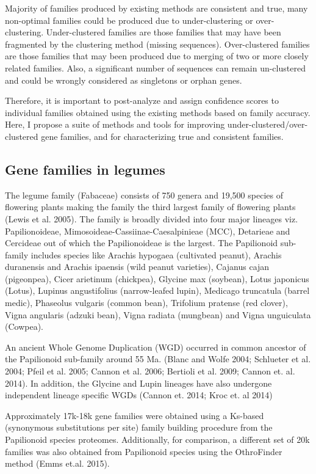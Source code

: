 \documentclass{article}
\begin{document}
		 Majority of families produced by existing methods are consistent and true, many non-optimal families could be produced due to under-clustering or over-clustering. Under-clustered families are those families that may have been fragmented by the clustering method (missing sequences). Over-clustered families are those families that may been produced due to merging of two or more closely related families. Also, a significant number of sequences can remain un-clustered and could be wrongly considered as singletons or orphan genes. 
		
		Therefore, it is important to post-analyze and assign confidence scores to individual families obtained using the existing methods based on family accuracy. Here, I propose a suite of methods and tools for improving under-clustered/over-clustered gene families, and for characterizing true and consistent families.
		
		\subsection{Gene families in legumes}
		The legume family (Fabaceae) consists of 750 genera and 19,500 species of flowering plants making the family the third largest family of flowering plants (Lewis et al. 2005). The family is broadly divided into four major lineages viz. Papilionoideae, Mimosoideae-Cassiinae-Caesalpinieae (MCC), Detarieae and Cercideae out of which the Papilionoideae is the largest. The Papilionoid sub-family includes species like Arachis hypogaea (cultivated peanut), Arachis duranensis and Arachis ipaensis (wild peanut varieties), Cajanus cajan (pigeonpea), Cicer arietinum (chickpea), Glycine max (soybean), Lotus japonicus (Lotus), Lupinus angustifolius (narrow-leafed lupin), Medicago truncatula (barrel medic), Phaseolus vulgaris (common bean), Trifolium pratense (red clover), Vigna angularis (adzuki bean), Vigna radiata (mungbean) and Vigna unguiculata (Cowpea).
		
		An ancient Whole Genome Duplication (WGD) occurred in common ancestor of the Papilionoid sub-family around 55 Ma. (Blanc and Wolfe 2004; Schlueter et al. 2004; Pfeil et al. 2005; Cannon et al. 2006; Bertioli et al. 2009; Cannon et. al. 2014). In addition, the Glycine and Lupin lineages have also undergone independent lineage specific WGDs (Cannon et. 2014; Kroc et. al 2014) 
		
		Approximately 17k-18k gene families were obtained using a Ks-based (synonymous substitutions per site) family building procedure from the Papilionoid species proteomes. Additionally, for comparison, a different set of 20k families was also obtained from Papilionoid species using the OthroFinder method (Emms et.al. 2015).
		\pagebreak
\end{document}
